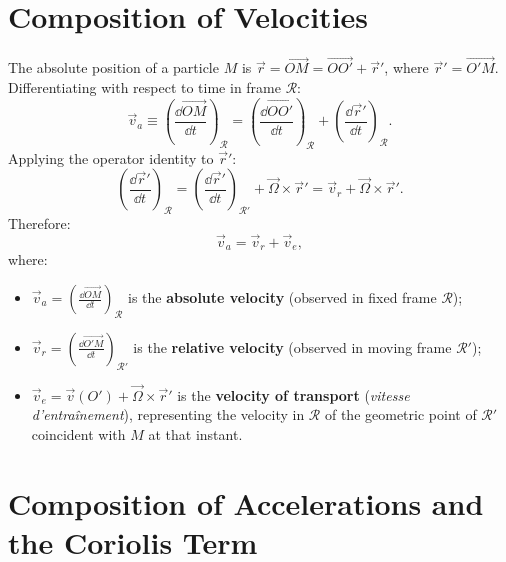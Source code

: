 \section{Composition of Velocities}

The absolute position of a particle $M$ is $\vec{r} = \vec{OM} = \vec{OO'} + \vec{r}'$, where $\vec{r}' = \vec{O'M}$.
Differentiating with respect to time in frame $\mathcal{R}$:
\[
\vec{v}_a \equiv \left(\frac{\dd\vec{OM}}{\dd t}\right)_{\mathcal{R}} = \left(\frac{\dd\vec{OO'}}{\dd t}\right)_{\mathcal{R}} + \left(\frac{\dd\vec{r}'}{\dd t}\right)_{\mathcal{R}}.
\]
Applying the operator identity to $\vec{r}'$:
\[
\left(\frac{\dd\vec{r}'}{\dd t}\right)_{\mathcal{R}} = \left(\frac{\dd\vec{r}'}{\dd t}\right)_{\mathcal{R}'} + \vec{\Omega}\times\vec{r}' = \vec{v}_r + \vec{\Omega}\times\vec{r}'.
\]
Therefore:
\[
\boxed{\vec{v}_a = \vec{v}_r + \vec{v}_e,}
\]
where:
\begin{itemize}[leftmargin=1.4em,itemsep=3pt]
  \item $\vec{v}_a = \left(\frac{\dd\vec{OM}}{\dd t}\right)_{\mathcal{R}}$ is the \textbf{absolute velocity} (observed in fixed frame $\mathcal{R}$);
  \item $\vec{v}_r = \left(\frac{\dd\vec{O'M}}{\dd t}\right)_{\mathcal{R}'}$ is the \textbf{relative velocity} (observed in moving frame $\mathcal{R}'$);
  \item $\vec{v}_e = \vec{v}(O') + \vec{\Omega}\times\vec{r}'$ is the \textbf{velocity of transport} (\emph{vitesse d'entraînement}), representing the velocity in $\mathcal{R}$ of the geometric point of $\mathcal{R}'$ coincident with $M$ at that instant.
\end{itemize}

\section{Composition of Accelerations and the Coriolis Term}

